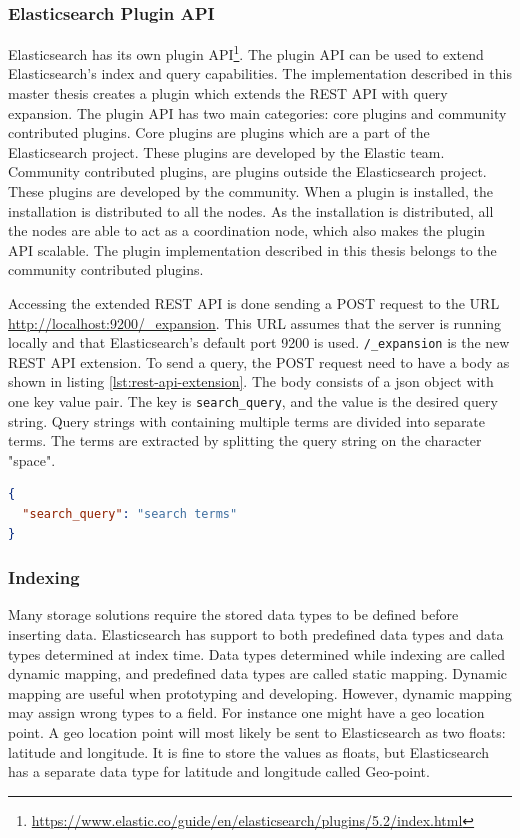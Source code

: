 \subsubsection{Elasticsearch Plugin API}
\label{sec:elasticsearch-plugin-api}
Elasticsearch has its own plugin API\footnote{\url{https://www.elastic.co/guide/en/elasticsearch/plugins/5.2/index.html}}.
The plugin API can be used to extend Elasticsearch's index and query capabilities.
The implementation described in this master thesis creates a plugin which extends the REST API with query expansion.
The plugin API has two main categories: core plugins and community contributed plugins.
Core plugins are plugins which are a part of the Elasticsearch project.
These plugins are developed by the Elastic team.
Community contributed plugins, are plugins outside the Elasticsearch project.
These plugins are developed by the community.
When a plugin is installed,
the installation is distributed to all the nodes.
As the installation is distributed,
all the nodes are able to act as a coordination node,
which also makes the plugin API scalable.
The plugin implementation described in this thesis belongs to the community contributed plugins.

Accessing the extended REST API is done sending a POST request to the URL \url{http://localhost:9200/_expansion}.
This URL assumes that the server is running locally and that Elasticsearch's default port 9200 is used.
\texttt{/\_expansion} is the new REST API extension.
To send a query, the POST request need to have a body as shown in listing \ref{lst:rest-api-extension}.
The body consists of a json object with one key value pair.
The key is \texttt{search\_query}, and the value is the desired query string.
Query strings with containing multiple terms are divided into separate terms.
The terms are extracted by splitting the query string on the character "space".

\begin{lstlisting}[language=json, caption={The POST request body for the implemented query expansion.}, label={lst:rest-api-extension}]
{
  "search_query": "search terms"
}
\end{lstlisting}

\subsubsection{Indexing}
Many storage solutions require the stored data types to be defined before inserting data.
Elasticsearch has support to both predefined data types and data types determined at index time.
Data types determined while indexing are called dynamic mapping, and predefined data types are called static mapping.
Dynamic mapping are useful when prototyping and developing.
However, dynamic mapping may assign wrong types to a field.
For instance one might have a geo location point.
A geo location point will most likely be sent to Elasticsearch as two floats: latitude and longitude.
It is fine to store the values as floats,
but Elasticsearch has a separate data type for latitude and longitude called Geo-point.

